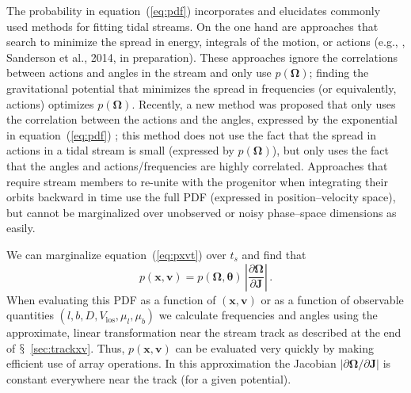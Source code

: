 \documentclass{emulateapj}
\newcommand{\etal}{et al.}
\newcommand{\eg}{e.g.}
\newcommand{\eqnname}{equation}
\newcommand{\equationname}{\eqnname}
\newcommand{\sectionname}{$\mathsection$}
\renewcommand{\vec}[1]{\ensuremath{\mathbf{#1}}}
\newcommand{\vecx}{\ensuremath{\vec{x}}}
\newcommand{\vecv}{\ensuremath{\vec{v}}}
\newcommand{\vecj}{\ensuremath{\vec{J}}}
\newcommand{\veco}{\ensuremath{\vec{\Omega}}}
\newcommand{\veca}{\ensuremath{\boldsymbol\theta}}
\newcommand{\vlos}{\ensuremath{V_{\mathrm{los}}}}
\newcommand{\pmll}{\ensuremath{\mu_l}}
\newcommand{\pmbb}{\ensuremath{\mu_b}}
\begin{document}
The probability in \eqnname~(\ref{eq:pdf}) incorporates and elucidates
commonly used methods for fitting tidal streams. On the one hand are
approaches that search to minimize the spread in energy, integrals of
the motion, or actions (\eg, \citealt{Binney08a,Penarrubia12a},
Sanderson \etal, 2014, in preparation). These approaches ignore the
correlations between actions and angles in the stream and only use
$p(\veco)$; finding the gravitational potential that minimizes the
spread in frequencies (or equivalently, actions) optimizes
$p(\veco)$. Recently, a new method was proposed that only uses the
correlation between the actions and the angles, expressed by the
exponential in \eqnname~(\ref{eq:pdf}) \citep{Sanders13b}; this method
does not use the fact that the spread in actions in a tidal stream is
small (expressed by $p(\veco)$), but only uses the fact that the
angles and actions/frequencies are highly correlated. Approaches that
require stream members to re-unite with the progenitor when
integrating their orbits backward in time
\citep{Johnston99a,PriceWhelan13a} use the full PDF (expressed in
position--velocity space), but cannot be marginalized over unobserved
or noisy phase--space dimensions as easily.

We can marginalize \equationname~(\ref{eq:pxvt}) over $t_s$ and find
that
\begin{equation}\label{eq:pxv}
  p(\vecx,\vecv) = p(\veco,\veca)\,\left|\frac{\partial
    \veco}{\partial \vecj}\right|\,.
\end{equation}
When evaluating this PDF as a function of $(\vecx,\vecv)$ or as a
function of observable quantities $(l,b,D,\vlos,\pmll,\pmbb)$ we
calculate frequencies and angles using the approximate, linear
transformation near the stream track as described at the end of
\sectionname~\ref{sec:trackxv}. Thus, $p(\vecx,\vecv)$ can be
evaluated very quickly by making efficient use of array operations. In
this approximation the Jacobian $|\partial \veco / \partial \vecj|$ is
constant everywhere near the track (for a given potential).
\end{document}
